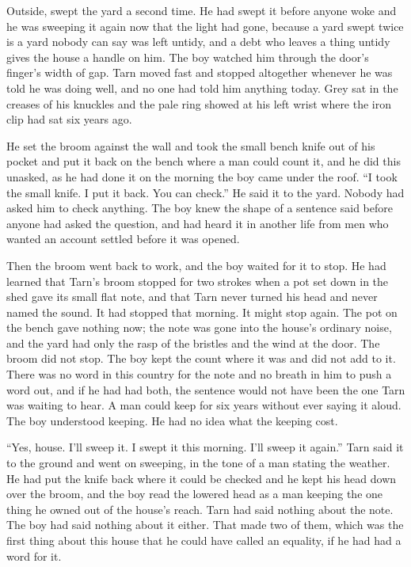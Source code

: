 Outside,  swept the yard a second time. He had swept it before anyone woke and he was sweeping it again now that the light had gone, because a yard swept twice is a yard nobody can say was left untidy, and a debt who leaves a thing untidy gives the house a handle on him. The boy watched him through the door's finger's width of gap. Tarn moved fast and stopped altogether whenever he was told he was doing well, and no one had told him anything today. Grey  sat in the creases of his knuckles and the pale ring showed at his left wrist where the iron clip had sat six years ago.

He set the broom against the wall and took the small bench knife out of his pocket and put it back on the bench where a man could count it, and he did this unasked, as he had done it on the morning the boy came under the roof. “I took the small knife. I put it back. You can check.” He said it to the yard. Nobody had asked him to check anything. The boy knew the shape of a sentence said before anyone had asked the question, and had heard it in another life from men who wanted an account settled before it was opened.

Then the broom went back to work, and the boy waited for it to stop. He had learned that Tarn's broom stopped for two strokes when a pot set down in the shed gave its small flat note, and that Tarn never turned his head and never named the sound. It had stopped that morning. It might stop again. The pot on the bench gave nothing now; the note was gone into the house's ordinary noise, and the yard had only the rasp of the bristles and the wind at the door. The broom did not stop. The boy kept the count where it was and did not add to it. There was no word in this country for the note and no breath in him to push a word out, and if he had had both, the sentence would not have been the one Tarn was waiting to hear. A man could keep  for six years without ever saying it aloud. The boy understood keeping. He had no idea what the keeping cost.

“Yes, house. I'll sweep it. I swept it this morning. I'll sweep it again.” Tarn said it to the ground and went on sweeping, in the tone of a man stating the weather. He had put the knife back where it could be checked and he kept his head down over the broom, and the boy read the lowered head as a man keeping the one thing he owned out of the house's reach. Tarn had said nothing about the note. The boy had said nothing about it either. That made two of them, which was the first thing about this house that he could have called an equality, if he had had a word for it.


